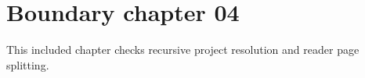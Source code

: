 \section{Boundary chapter 04}
\label{sec:boundary-04}
This included chapter checks recursive project resolution and reader page splitting.

